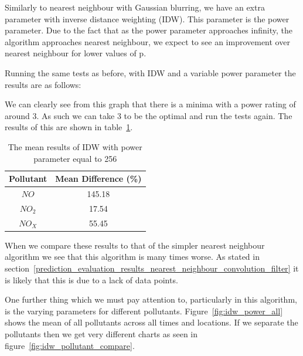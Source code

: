 
        	Similarly to nearest neighbour with Gaussian blurring, we have an extra parameter with inverse distance weighting (IDW). This parameter is the power parameter. Due to the fact that as the power parameter approaches infinity, the algorithm approaches nearest neighbour, we expect to see an improvement over nearest neighbour for lower values of p.

        	Running the same tests as before, with IDW and a variable power parameter the results are as follows:


        	We can clearly see from this graph that there is a minima with a power rating of around 3. As such we can take 3 to be the optimal and run the tests again. The results of this are shown in table~\ref{tab:idw_results}.

        	\begin{table}
				\centering
	    		\begin{tabular}{|c|c|}
	    			\hline
					Pollutant & Mean Difference (\%) \\ \hline
					$NO$ & 145.18 \\
					$NO_{2}$ & 17.54 \\
					$NO_{X}$ & 55.45 \\
					\hline
				\end{tabular}
				\caption{The mean results of IDW with power parameter equal to 256}
				\label{tab:idw_results}
			\end{table}

			When we compare these results to that of the simpler nearest neighbour algorithm we see that this algorithm is many times worse. As stated in section~\ref{prediction_evaluation_results_nearest_neighbour_convolution_filter} it is likely that this is due to a lack of data points. 

			One further thing which we must pay attention to, particularly in this algorithm, is the varying parameters for different pollutants. Figure~\ref{fig:idw_power_all} shows the mean of all pollutants across all times and locations. If we separate the pollutants then we get very different charts as seen in figure~\ref{fig:idw_pollutant_compare}.

